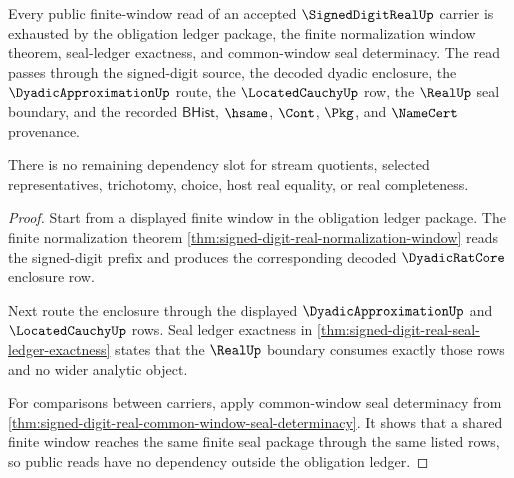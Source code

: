 \begin{theorem}
\label{thm:signed-digit-real-dependency-scope-exhaustion}
Every public finite-window read of an accepted $\SignedDigitRealUp$ carrier is exhausted by the obligation ledger package, the finite normalization window theorem, seal-ledger exactness, and common-window seal determinacy. The read passes through the signed-digit source, the decoded dyadic enclosure, the $\DyadicApproximationUp$ route, the $\LocatedCauchyUp$ row, the $\RealUp$ seal boundary, and the recorded $\mathsf{BHist}$, $\hsame$, $\Cont$, $\Pkg$, and $\NameCert$ provenance.

There is no remaining dependency slot for stream quotients, selected representatives, trichotomy, choice, host real equality, or real completeness.
\end{theorem}
\begin{proof}
Start from a displayed finite window in the obligation ledger package. The finite normalization theorem \autoref{thm:signed-digit-real-normalization-window} reads the signed-digit prefix and produces the corresponding decoded $\DyadicRatCore$ enclosure row.

Next route the enclosure through the displayed $\DyadicApproximationUp$ and $\LocatedCauchyUp$ rows. Seal ledger exactness in \autoref{thm:signed-digit-real-seal-ledger-exactness} states that the $\RealUp$ boundary consumes exactly those rows and no wider analytic object.

For comparisons between carriers, apply common-window seal determinacy from \autoref{thm:signed-digit-real-common-window-seal-determinacy}. It shows that a shared finite window reaches the same finite seal package through the same listed rows, so public reads have no dependency outside the obligation ledger.
\end{proof}

